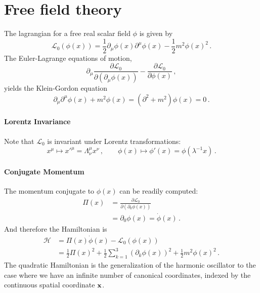 
\section{Free field theory}
\label{sec:real-scalar-field}

The lagrangian for a free real scalar field $\phi$ is given by
\begin{equation}
  \label{eq:RealScalLagr}
  \mathcal{L}_0\left(\phi(x)\right)=
  \frac12 \partial_\mu \phi(x) \partial^\mu \phi(x) - 
  \frac12 m^2 \phi(x)^2\, .
\end{equation}
The Euler-Lagrange equations of motion, 
\begin{equation}
  \label{eq:EulerLagrange}
  \partial_\mu \frac{\partial \mathcal{L}_0}{\partial\left(\partial_\mu \phi(x)\right)} 
  - \frac{\partial \mathcal{L}_0}{\partial \phi(x)}\, ,
\end{equation}
yields the Klein-Gordon equation
\begin{equation}
  \label{eq:KleinGordonScal}
  \partial_\mu \partial^\mu \phi(x) + m^2 \phi(x) = \left( \partial^2 + m^2 \right) \phi(x) = 0\, . 
\end{equation}

\paragraph{Lorentz Invariance}

Note that $\mathcal{L}_0$ is invariant under Lorentz transformations:
\begin{equation}
  \label{eq:LorentzTransfScal}
  x^\mu \mapsto x'^\mu =  \Lambda^\mu_\nu x^\nu\, , \quad \quad 
  \phi(x) \mapsto \phi'(x) = \phi(\lambda^{-1}x)\, .
\end{equation}

\paragraph{Conjugate Momentum} 

The momentum conjugate to $\phi(x)$ can be readily computed:
\begin{align}
  \label{eq:ScalMom}
  \Pi(x) &= \frac{\partial \mathcal{L}_0}{\partial (\partial_0\phi(x))} \\
  &= \partial_0 \phi(x) = \dot{\phi}(x)\, .
\end{align}
And therefore the Hamiltonian is 
\begin{align}
  \mathcal{H} &= \Pi(x) \dot{\phi}(x) - \mathcal{L}_0\left(\phi(x)\right) \\
  &= \frac12 \Pi(x)^2 + \frac12 \sum_{k=1}^3 \left(\partial_k \phi(x)\right)^2
    + \frac12 m^2 \phi(x)^2\, .
\end{align}
The quadratic Hamiltonian is the generalization of the harmonic oscillator to the case where we have an infinite number of canonical coordinates, indexed by the continuous spatial coordinate ${\mathbf x}$. 

